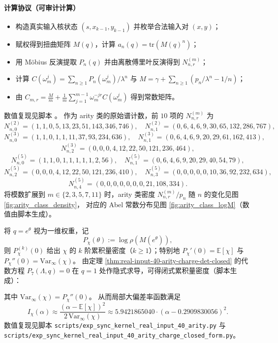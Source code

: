 \paragraph{计算协议（可审计计算）}
\begin{itemize}
  \item 构造真实输入核状态 $(s,x_{k-1},y_{k-1})$ 并枚举合法输入对 $(x,y)$；
  \item 赋权得到扭曲矩阵 $M(q)$，计算 $a_n(q)=\mathrm{tr}(M(q)^n)$；
  \item 用 Möbius 反演提取 $P_n(q)$ 并由离散傅里叶反演得到 $N_{n,r}^{(m)}$；
  \item 计算 $C(\omega_m^j)=\sum_{n\ge 1}P_n(\omega_m^j)/\lambda^n$ 与
  $M=\gamma+\sum_{n\ge 1}(p_n/\lambda^n-1/n)$；
  \item 由 $C_{m,r}=\frac{M}{m}+\frac{1}{m}\sum_{j=1}^{m-1}\omega_m^{-jr}C(\omega_m^j)$ 得到常数矩阵。
\end{itemize}
数值复现见脚本 。
作为 arity 类的原始谱计数，前 $10$ 项的 $N_{n,r}^{(m)}$ 为
\[
N_{n,0}^{(2)}=(1,1,0,5,13,23,51,143,346,746),\quad
N_{n,1}^{(2)}=(0,6,4,6,9,30,65,132,286,767),
\]
\[
N_{n,0}^{(3)}=(1,1,0,1,1,11,37,93,234,636),\quad
N_{n,1}^{(3)}=(0,6,4,6,9,20,29,61,162,413),
\]
\[
N_{n,2}^{(3)}=(0,0,0,4,12,22,50,121,236,464),
\]
\[
N_{n,0}^{(5)}=(1,1,0,1,1,1,1,1,2,56),\quad
N_{n,1}^{(5)}=(0,6,4,6,9,20,29,40,54,79),
\]
\[
N_{n,2}^{(5)}=(0,0,0,4,12,22,50,121,236,410),\quad
N_{n,3}^{(5)}=(0,0,0,0,0,10,36,92,232,634),
\]
\[
N_{n,4}^{(5)}=(0,0,0,0,0,0,0,21,108,334).
\]
将模数扩展到 $m\in\{2,3,5,7,11\}$ 时，arity 类密度 $N_{n,r}^{(m)}/p_n$ 随 $n$ 的变化见图 \ref{fig:arity_class_density}，
对应的 Abel 常数分布见图 \ref{fig:arity_class_logM}（数值由脚本生成）。


将 $q=e^\theta$ 视为一维权重，记
\[
P_\chi(\theta):=\log\rho(M(e^\theta)),
\]
则 $P_\chi^{(k)}(0)$ 给出 $\chi$ 的 $k$ 阶累积量密度（$k\ge 1$）；特别地
$P_\chi'(0)=\mathbb{E}[\chi]$ 与 $P_\chi''(0)=\mathrm{Var}_\infty(\chi)$。
由定理 \ref{thm:real-input-40-arity-charge-det-closed} 的代数方程 $P_7(\Lambda,q)=0$ 在 $q=1$ 处作隐式求导，可得闭式累积量密度（脚本生成）：

其中 $\mathrm{Var}_\infty(\chi)=P_\chi''(0)$。
从而局部大偏差率函数满足
\[
I_\chi(\alpha)\approx \frac{(\alpha-\mathbb{E}[\chi])^2}{2\,\mathrm{Var}_\infty(\chi)}
\approx 5.9421865040\cdot(\alpha-0.2909830056)^2.
\]
数值复现见脚本 \texttt{scripts/exp\_sync\_kernel\_real\_input\_40\_arity.py} 与
\texttt{scripts/exp\_sync\_kernel\_real\_input\_40\_arity\_charge\_closed\_form.py}。

